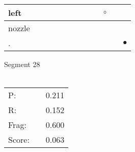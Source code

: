\documentclass[landscape]{article}
\newcommand{\ssp}{\hspace{2pt}}
\newcommand{\mex}{\cellcolor{g}$\bullet$}
\newcommand{\map}{\cellcolor{y}$\boldsymbol\circ$}
\begin{document}
\begin{tabular}{|l|p{10pt}|p{10pt}|p{10pt}|p{10pt}|p{10pt}|p{10pt}|p{10pt}|p{10pt}|p{10pt}|p{10pt}|p{10pt}|}
\hline
\ssp \cellcolor{ref8}left \ssp&\hspace{2pt}&\hspace{2pt}&\hspace{2pt}&\hspace{2pt}&\hspace{2pt}&\hspace{2pt}&\hspace{2pt}&\hspace{2pt}&\hspace{2pt}\map&\hspace{2pt}&\hspace{2pt}\\
\hline
\ssp nozzle \ssp&\hspace{2pt}&\hspace{2pt}&\hspace{2pt}&\hspace{2pt}&\hspace{2pt}&\hspace{2pt}&\hspace{2pt}&\hspace{2pt}&\hspace{2pt}&\hspace{2pt}&\hspace{2pt}\\
\hline
\ssp \cellcolor{ref10}. \ssp&\hspace{2pt}&\hspace{2pt}&\hspace{2pt}&\hspace{2pt}&\hspace{2pt}&\hspace{2pt}&\hspace{2pt}&\hspace{2pt}&\hspace{2pt}&\hspace{2pt}&\hspace{2pt}\mex\\
\hline
\end{tabular}

\vspace{6pt}
\noindent Segment 28\\\\
\noindent\begin{tabular}{lm{12pt}r}
\hline
P:&&0.211\\
R:&&0.152\\
Frag:&&0.600\\
Score:&&0.063\\
\end{tabular}
\end{document}
